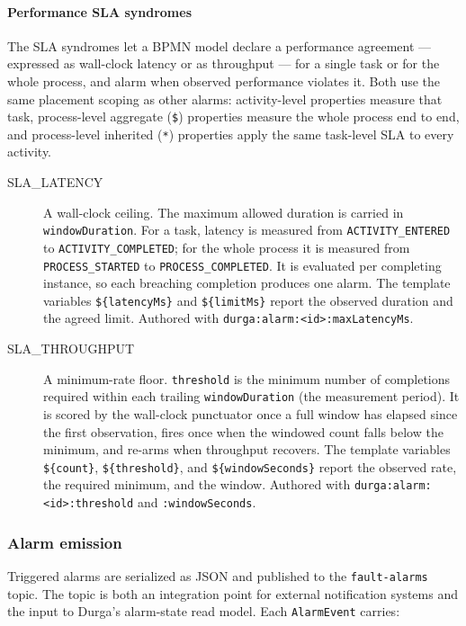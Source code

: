 \paragraph{Performance SLA syndromes}

The SLA syndromes let a BPMN model declare a performance agreement --- expressed
as wall-clock latency or as throughput --- for a single task or for the whole
process, and alarm when observed performance violates it. Both use the same
placement scoping as other alarms: activity-level properties measure that task,
process-level aggregate (\texttt{\$}) properties measure the whole process end to
end, and process-level inherited (\texttt{*}) properties apply the same task-level
SLA to every activity.

\begin{description}

\item[SLA\_LATENCY] A wall-clock ceiling. The maximum allowed duration is carried
in \texttt{windowDuration}. For a task, latency is measured from
\texttt{ACTIVITY\_ENTERED} to \texttt{ACTIVITY\_COMPLETED}; for the whole process
it is measured from \texttt{PROCESS\_STARTED} to \texttt{PROCESS\_COMPLETED}. It is
evaluated per completing instance, so each breaching completion produces one alarm.
The template variables \texttt{\$\{latencyMs\}} and \texttt{\$\{limitMs\}} report
the observed duration and the agreed limit. Authored with
\texttt{durga:alarm:<id>:maxLatencyMs}.

\item[SLA\_THROUGHPUT] A minimum-rate floor. \texttt{threshold} is the minimum
number of completions required within each trailing \texttt{windowDuration}
(the measurement period). It is scored by the wall-clock punctuator once a full
window has elapsed since the first observation, fires once when the windowed
count falls below the minimum, and re-arms when throughput recovers. The template
variables \texttt{\$\{count\}}, \texttt{\$\{threshold\}}, and
\texttt{\$\{windowSeconds\}} report the observed rate, the required minimum, and
the window. Authored with \texttt{durga:alarm:<id>:threshold} and
\texttt{:windowSeconds}.

\end{description}

\subsubsection{Alarm emission}

Triggered alarms are serialized as JSON and published to the
\texttt{fault-alarms} topic. The topic is both an integration point for
external notification systems and the input to Durga's alarm-state read model.
Each \texttt{AlarmEvent} carries:

